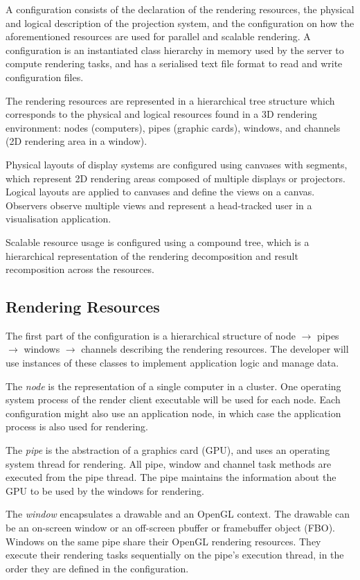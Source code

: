 A configuration consists of the declaration of the rendering resources, the
physical and logical description of the projection system, and the
configuration on how the aforementioned resources are used for parallel and
scalable rendering. A configuration is an instantiated class hierarchy in
memory used by the server to compute rendering tasks, and has a serialised text
file format to read and write configuration files.

The rendering resources are represented in a hierarchical tree structure
which corresponds to the physical and logical resources found in a 3D
rendering environment: nodes (computers), pipes (graphic cards),
windows, and channels (2D rendering area in a window).

Physical layouts of display systems are configured using canvases with
segments, which represent 2D rendering areas composed of multiple displays or
projectors. Logical layouts are applied to canvases and define the views on a
canvas. Observers observe multiple views and represent a head-tracked user in a
visualisation application.

Scalable resource usage is configured using a compound tree, which is a
hierarchical representation of the rendering decomposition and result
recomposition across the resources.

\subsection{Rendering Resources}

The first part of the configuration is a hierarchical structure of node
$\rightarrow$ pipes $\rightarrow$ win\-dows $\rightarrow$ channels describing
the rendering resources. The developer will use instances of these classes to
implement application logic and manage data.

The {\em node} is the representation of a single computer in a cluster. One operating
system process of the render client executable will be used for each node. Each
configuration might also use an application node, in which case the application
process is also used for rendering.

The {\em pipe} is the abstraction of a graphics card (GPU), and uses an
operating system thread for rendering. All pipe, window and channel task methods
are executed from the pipe thread. The pipe maintains the information about the
GPU to be used by the windows for rendering.

The {\em window} encapsulates a drawable and an OpenGL context. The drawable
can be an on-screen window or an off-screen pbuffer or framebuffer object
(FBO). Windows on the same pipe share their OpenGL rendering resources. They
execute their rendering tasks sequentially on the pipe's execution thread, in
the order they are defined in the configuration.


